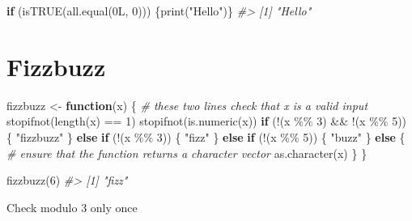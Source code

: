 \documentclass[
]{book}
\newenvironment{Shaded}{\begin{snugshade}}{\end{snugshade}}
\newcommand{\CommentTok}[1]{\textcolor[rgb]{0.56,0.35,0.01}{\textit{#1}}}
\newcommand{\ControlFlowTok}[1]{\textcolor[rgb]{0.13,0.29,0.53}{\textbf{#1}}}
\newcommand{\DecValTok}[1]{\textcolor[rgb]{0.00,0.00,0.81}{#1}}
\newcommand{\FunctionTok}[1]{\textcolor[rgb]{0.00,0.00,0.00}{#1}}
\newcommand{\NormalTok}[1]{#1}
\newcommand{\OtherTok}[1]{\textcolor[rgb]{0.56,0.35,0.01}{#1}}
\newcommand{\SpecialCharTok}[1]{\textcolor[rgb]{0.00,0.00,0.00}{#1}}
\newcommand{\StringTok}[1]{\textcolor[rgb]{0.31,0.60,0.02}{#1}}
\begin{document}
\begin{Shaded}
\begin{Highlighting}[]
\ControlFlowTok{if}\NormalTok{ (}\FunctionTok{isTRUE}\NormalTok{(}\FunctionTok{all.equal}\NormalTok{(0L, }\DecValTok{0}\NormalTok{))) \{}\FunctionTok{print}\NormalTok{(}\StringTok{"Hello"}\NormalTok{)\}}
\CommentTok{\#\textgreater{} [1] "Hello"}
\end{Highlighting}
\end{Shaded}

\hypertarget{fizzbuzz}{%
\section{Fizzbuzz}\label{fizzbuzz}}

\begin{Shaded}
\begin{Highlighting}[]
\NormalTok{fizzbuzz }\OtherTok{\textless{}{-}} \ControlFlowTok{function}\NormalTok{(x) \{}
  \CommentTok{\# these two lines check that x is a valid input}
  \FunctionTok{stopifnot}\NormalTok{(}\FunctionTok{length}\NormalTok{(x) }\SpecialCharTok{==} \DecValTok{1}\NormalTok{)}
  \FunctionTok{stopifnot}\NormalTok{(}\FunctionTok{is.numeric}\NormalTok{(x))}
  \ControlFlowTok{if}\NormalTok{ (}\SpecialCharTok{!}\NormalTok{(x }\SpecialCharTok{\%\%} \DecValTok{3}\NormalTok{) }\SpecialCharTok{\&\&} \SpecialCharTok{!}\NormalTok{(x }\SpecialCharTok{\%\%} \DecValTok{5}\NormalTok{)) \{}
    \StringTok{"fizzbuzz"}
\NormalTok{  \} }\ControlFlowTok{else} \ControlFlowTok{if}\NormalTok{ (}\SpecialCharTok{!}\NormalTok{(x }\SpecialCharTok{\%\%} \DecValTok{3}\NormalTok{)) \{}
    \StringTok{"fizz"}
\NormalTok{  \} }\ControlFlowTok{else} \ControlFlowTok{if}\NormalTok{ (}\SpecialCharTok{!}\NormalTok{(x }\SpecialCharTok{\%\%} \DecValTok{5}\NormalTok{)) \{}
    \StringTok{"buzz"}
\NormalTok{  \} }\ControlFlowTok{else}\NormalTok{ \{}
    \CommentTok{\# ensure that the function returns a character vector}
    \FunctionTok{as.character}\NormalTok{(x)}
\NormalTok{  \}}
\NormalTok{\}}
\end{Highlighting}
\end{Shaded}

\begin{Shaded}
\begin{Highlighting}[]
\FunctionTok{fizzbuzz}\NormalTok{(}\DecValTok{6}\NormalTok{)}
\CommentTok{\#\textgreater{} [1] "fizz"}
\end{Highlighting}
\end{Shaded}

Check modulo 3 only once
\end{document}
